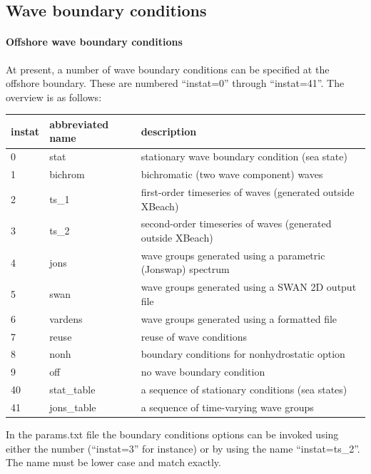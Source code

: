 \subsection{ Wave boundary conditions}
\paragraph{Offshore wave boundary conditions}

At present, a number of wave boundary conditions can be specified at the offshore boundary. These are numbered ``instat=0'' through ``instat=41''. The overview is as follows:

\begin{tabular}{|p{0.5in}|p{0.8in}|p{2.6in}|} \hline 
instat & abbreviated name & description \\ \hline 
0 & stat & stationary wave boundary condition (sea state) \\ \hline 
1 & bichrom & bichromatic (two wave component) waves \\ \hline 
2 & ts\_1 & first-order timeseries of waves (generated outside XBeach) \\ \hline 
3 & ts\_2 & second-order timeseries of waves (generated outside XBeach) \\ \hline 
4 & jons & wave groups generated using a parametric (Jonswap) spectrum \\ \hline 
5 & swan & wave groups generated using a SWAN 2D output file \\ \hline 
6 & vardens & wave groups generated using a formatted file \\ \hline 
7 & reuse & reuse of wave conditions \\ \hline 
8 & nonh & boundary conditions for nonhydrostatic option \\ \hline 
9 & off & no wave boundary condition \\ \hline 
40 & stat\_table & a sequence of stationary conditions (sea states) \\ \hline 
41 & jons\_table & a sequence of time-varying wave groups \\ \hline 
\end{tabular}

In the params.txt file the boundary conditions options can be invoked using either the number (``instat=3'' for instance) or by using the name ``instat=ts\_2''. The name must be lower case and match exactly.

\textit{} 

